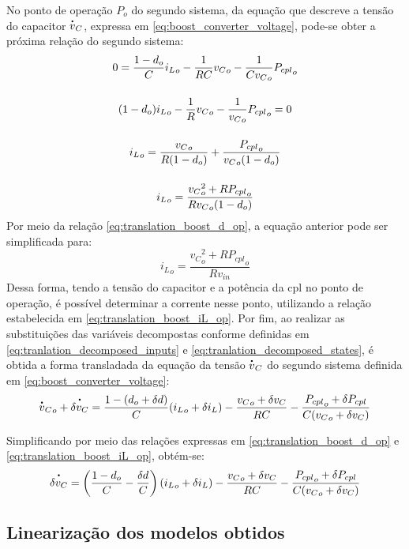 No ponto de operação $P_o$ do segundo sistema, da equação que descreve a tensão do capacitor $\dt{v}_C$, expressa em \eqref{eq:boost_converter_voltage}, pode-se obter a próxima relação do segundo sistema: \begin{gather}
  0 = \frac{1 - d_o}{C} {i_L}_o - \frac{1}{RC}{v_C}_o - \frac{1}{C{v_C}_o}{P_{cpl}}_o \notag \\[12pt]
  (1 - d_o){i_L}_o - \frac{1}{R}{v_C}_o - \frac{1}{{v_C}_o}{P_{cpl}}_o = 0 \notag \\[12pt]
  {i_L}_o = \frac{{v_C}_o}{R(1-d_o)} + \frac{{P_{cpl}}_o}{{v_C}_o (1 - d_o)} \notag \\[12pt]
  {i_L}_o = \frac{{v_C}^2_o + R{P_{cpl}}_o}{R{v_C}_o(1 - d_o)}
\end{gather} Por meio da relação \eqref{eq:translation_boost_d_op}, a equação anterior pode ser simplificada para: \begin{equation}
  {i_L}_o = \frac{{v_C}^2_o + R{P_{cpl}}_o}{R{v_{in}}}
  \label{eq:translation_boost_iL_op}
\end{equation} Dessa forma, tendo a tensão do capacitor e a potência da \acrshort{cpl} no ponto de operação, é possível determinar a corrente nesse ponto, utilizando a relação estabelecida em \eqref{eq:translation_boost_iL_op}. Por fim, ao realizar as substituições das variáveis decompostas conforme definidas em \eqref{eq:tranlation_decomposed_inputs} e \eqref{eq:tranlation_decomposed_states}, é obtida a forma transladada da equação da tensão $\dt{v}_C$ do segundo sistema definida em \eqref{eq:boost_converter_voltage}: \begin{gather}
  {{\dt{v}_C}}_o + \dt{\delta {v}_C} = \frac{1 - (d_o + \delta d)}{C} ( {i_L}_o + \delta i_L) - \frac{{v_C}_o + \delta v_C}{RC} - \frac{{{P_{cpl}}_o + \delta P_{cpl}}}{C({v_C}_o + \delta {v_C})}
\end{gather}

Simplificando por meio das relações expressas em \eqref{eq:translation_boost_d_op} e \eqref{eq:translation_boost_iL_op}, obtém-se: \begin{gather}
  \dt{\delta {v}_C} = \left( \frac{1 - d_o}{C} - \frac{\delta d}{C} \right)\left({i_L}_o + \delta i_L\right) - \frac{{v_C}_o + \delta v_C}{RC} - \frac{{{P_{cpl}}_o + \delta P_{cpl}}}{C({v_C}_o + \delta {v_C})}
\end{gather}

\subsection{Linearização dos modelos obtidos}


